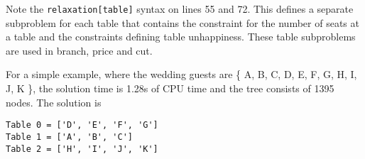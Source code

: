 Note the \texttt{relaxation[table]} syntax on lines 55 and 72. This defines a separate subproblem for each table that contains the constraint for the number of seats at a table and the constraints defining table unhappiness. These table subproblems are used in branch, price and cut.

For a simple example, where the wedding guests are \{ A, B, C, D, E, F, G, H, I, J, K \}, the solution time is 1.28s of CPU time and the tree consists of 1395 nodes. The solution is
\begin{verbatim}
Table 0 = ['D', 'E', 'F', 'G']
Table 1 = ['A', 'B', 'C']
Table 2 = ['H', 'I', 'J', 'K']
\end{verbatim}

